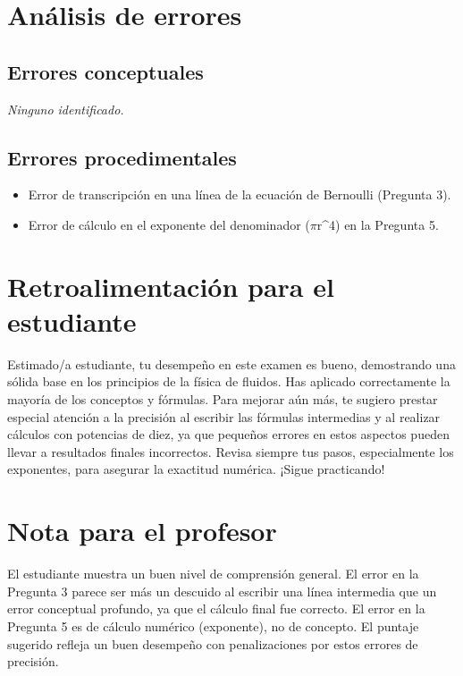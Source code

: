 \documentclass[11pt,a4paper]{article}
\begin{document}
\section*{Análisis de errores}

\subsection*{Errores conceptuales}
\textit{Ninguno identificado.}

\subsection*{Errores procedimentales}
\begin{itemize}[leftmargin=1.5em, itemsep=2pt]
  \item Error de transcripción en una línea de la ecuación de Bernoulli (Pregunta 3).
  \item Error de cálculo en el exponente del denominador ($\pi$r\textasciicircum{}4) en la Pregunta 5.
\end{itemize}

\section*{Retroalimentación para el estudiante}
\begin{tcolorbox}[cajaRecomendacion, title={Dirigido a: franyerica rodriguez 33278284}]
Estimado/a estudiante, tu desempeño en este examen es bueno, demostrando una sólida base en los principios de la física de fluidos. Has aplicado correctamente la mayoría de los conceptos y fórmulas. Para mejorar aún más, te sugiero prestar especial atención a la precisión al escribir las fórmulas intermedias y al realizar cálculos con potencias de diez, ya que pequeños errores en estos aspectos pueden llevar a resultados finales incorrectos. Revisa siempre tus pasos, especialmente los exponentes, para asegurar la exactitud numérica. ¡Sigue practicando!
\end{tcolorbox}

\section*{Nota para el profesor}
\begin{tcolorbox}[
  enhanced, breakable,
  colback=yellow!8, colframe=yellow!60!black,
  fonttitle=\bfseries, coltitle=black,
  title={Observaciones para revisión manual},
  top=4pt, bottom=4pt, left=8pt, right=8pt,
]
El estudiante muestra un buen nivel de comprensión general. El error en la Pregunta 3 parece ser más un descuido al escribir una línea intermedia que un error conceptual profundo, ya que el cálculo final fue correcto. El error en la Pregunta 5 es de cálculo numérico (exponente), no de concepto. El puntaje sugerido refleja un buen desempeño con penalizaciones por estos errores de precisión.
\end{tcolorbox}
\end{document}
